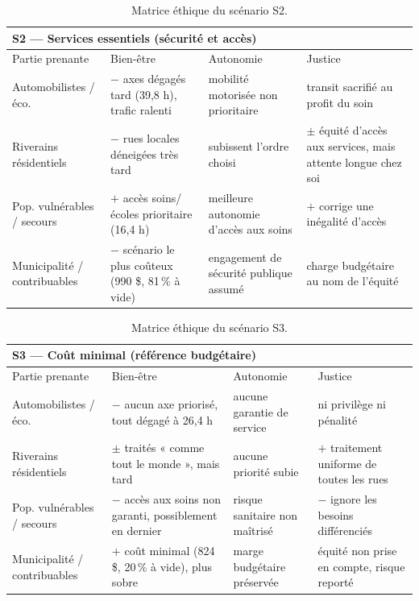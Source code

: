 \documentclass[11pt,a4paper]{article}
\begin{document}
\begin{table}[H]
\centering\small
\renewcommand{\arraystretch}{1.2}
\begin{tabular}{p{2.6cm}p{4.0cm}p{3.7cm}p{3.8cm}}
\toprule
\multicolumn{4}{l}{\textbf{S2 — Services essentiels} (sécurité et accès)}\\
\midrule
Partie prenante & Bien-être & Autonomie & Justice\\
\midrule
Automobilistes / éco. & \textbf{$-$} axes dégagés tard (39,8 h), trafic ralenti & mobilité motorisée non prioritaire & transit sacrifié au profit du soin\\
Riverains résidentiels & \textbf{$-$} rues locales déneigées très tard & subissent l'ordre choisi & \textbf{$\pm$} équité d'accès aux services, mais attente longue chez soi\\
Pop. vulnérables / secours & \textbf{$+$} accès soins/écoles prioritaire (16,4 h) & meilleure autonomie d'accès aux soins & \textbf{$+$} corrige une inégalité d'accès\\
Municipalité / contribuables & \textbf{$-$} scénario le plus coûteux (990 \$, 81\,\% à vide) & engagement de sécurité publique assumé & charge budgétaire au nom de l'équité\\
\bottomrule
\end{tabular}
\caption{Matrice éthique du scénario S2.}
\label{tab:ethique_s2}
\end{table}

\begin{table}[H]
\centering\small
\renewcommand{\arraystretch}{1.2}
\begin{tabular}{p{2.6cm}p{4.0cm}p{3.7cm}p{3.8cm}}
\toprule
\multicolumn{4}{l}{\textbf{S3 — Coût minimal} (référence budgétaire)}\\
\midrule
Partie prenante & Bien-être & Autonomie & Justice\\
\midrule
Automobilistes / éco. & \textbf{$-$} aucun axe priorisé, tout dégagé à 26,4 h & aucune garantie de service & ni privilège ni pénalité\\
Riverains résidentiels & \textbf{$\pm$} traités « comme tout le monde », mais tard & aucune priorité subie & \textbf{$+$} traitement uniforme de toutes les rues\\
Pop. vulnérables / secours & \textbf{$-$} accès aux soins non garanti, possiblement en dernier & risque sanitaire non maîtrisé & \textbf{$-$} ignore les besoins différenciés\\
Municipalité / contribuables & \textbf{$+$} coût minimal (824 \$, 20\,\% à vide), plus sobre & marge budgétaire préservée & équité non prise en compte, risque reporté\\
\bottomrule
\end{tabular}
\caption{Matrice éthique du scénario S3.}
\label{tab:ethique_s3}
\end{table}
\end{document}
